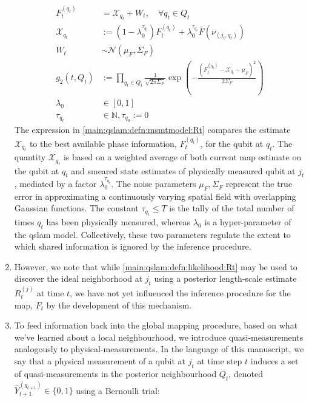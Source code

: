 \begin{enumerate}
	\begin{align}
		F_t^{(q_t)} &= \mathcal{X}_{q_t} + W_t, \quad \forall q_t \in Q_t  \label{main:qslam:defn:msmtmodel:Rt}\\
		\mathcal{X}_{q_t} &:= (1 - \lambda_0^{\tau_{q_t}})F_t^{(q_t)} + \lambda_0^{\tau_{q_t}} \bar{F}(\nu_{(j_t,q_t)}) \label{main:qslam:defn:msmtmodel:Rt:Xqt} \\
		W_t & \sim \mathcal{N}(\mu_F, \Sigma_F) \\
		g_2(t, Q_t) & := \prod_{q_t \in Q_t} \frac{1}{\sqrt{2\pi \Sigma_F}} \exp \left( -\frac{( F_t^{(q_t)} - \mathcal{X}_{q_t} - \mu_F )^2}{2 \Sigma_F }\right) \label{main:qslam:defn:likelihood:Rt}\\
		\lambda_0 &\in [0,1] \\
		\tau_{q_t} &\in \mathbb{N}, \tau_{q_0}:= 0
	\end{align} The expression in \cref{main:qslam:defn:msmtmodel:Rt} compares the estimate $\mathcal{X}_{q_t} $ to the best available phase information, $F_t^{(q_t)}$, for the qubit at $q_t$. The quantity $\mathcal{X}_{q_t}$ is based on a weighted average of both current map estimate on the qubit at $q_t$ and smeared state estimates of physically measured qubit at $j_t$, mediated by a factor $\lambda_0^{\tau_{q_t}}$.  The noise parameters $ \mu_F, \Sigma_F$ represent the true error in approximating a continuously varying spatial field with overlapping Gaussian functions. The constant $ \tau_{q_t} \leq T$  is the tally of the total number of times $q_t$ has been physically measured, whereas $\lambda_0$ is a hyper-parameter of the qslam model. Collectively, these two parameters regulate the extent to which shared information is ignored by the inference procedure.  
	\item However, we note that while \cref{main:qslam:defn:likelihood:Rt} may be used to discover the ideal neighborhood at $j_t$ using a posterior length-scale estimate $R_t^{(j)}$ at time $t$,  we have not yet influenced the inference procedure for the map, $F_t$ by the development of this mechanism. 
	\item To feed information back into the global mapping procedure, based on what we've learned about a local neighbourhood, we introduce quasi-measurements analogously to physical-measurements. In the language of this manuscript, we say that a physical measurement of a qubit at $j_t$ at time step $t$ induces a set of quasi-measurements in the posterior neighbourhood $Q_t$, denoted $\hat{Y}_{t+1}^{(q_{t+1})} \in \{0,1\}$ using a Bernoulli trial:
	 	\begin{align}

\end{align}
\end{enumerate}

